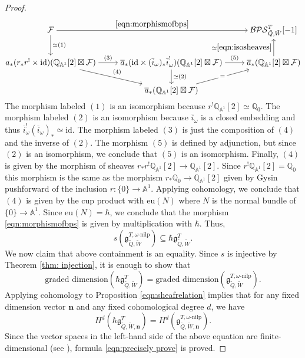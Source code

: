 \documentclass{amsart}
\def\oi{\overline{i}}
\def\bn{{\boldsymbol{n}}}
\begin{document}
\begin{proof}
\[\begin{tikzcd}[cramped]
	{\mathcal{F}} && {\mathcal{BPS}^T_{\tilde{Q},\tilde{W}}[-1]} \\
	{a_{*}(r_{*}r^! \times \mathrm{id})(\mathbb{Q}_{\mathbb{A}^1}[2] \boxtimes \mathcal{F}}) & {\overline{a}_{*}(\mathrm{id} \times (\oi_{\omega})_{*}\oi_{\omega}^!)(\mathbb{Q}_{\mathbb{A}^1}[2] \boxtimes \mathcal{F})} & {\overline{a}_{*}(\mathbb{Q}_{\mathbb{A}^1}[2] \boxtimes \mathcal{F})} \\
	& {\overline{a}_{*}(\mathbb{Q}_{\mathbb{A}^1}[2] \boxtimes \mathcal{F})}
	\arrow["{\eqref{eqn:morphismofbps}}", from=1-1, to=1-3]
	\arrow["{{\simeq (1) } }", from=1-1, to=2-1]
	\arrow["{(3)}", from=2-1, to=2-2]
	\arrow["{(4)}", from=2-1, to=3-2]
	\arrow["{(5)}", from=2-2, to=2-3]
	\arrow["{\simeq (2)}", from=2-2, to=3-2]
	\arrow["{{\simeq \eqref{eqn:isosheaves}}}", from=2-3, to=1-3]
	\arrow["{=}"{description}, from=3-2, to=2-3]
\end{tikzcd}\]
The morphism labeled $(1)$ is an isomorphism because $r^! \mathbb{Q}_{\mathbb{A}^1}[2] \simeq \mathbb{Q}_{0}$. The morphism labeled $(2)$ is an isomorphism because $\overline{i}_{\omega}$ is a closed embedding and thus $\oi^{!}_{\omega}(\oi_{\omega})_{*} \simeq \mathrm{id}.$ The morphism labeled $(3)$ is just the composition of $(4)$ and the inverse of $(2)$. The morphism $(5)$ is defined by adjunction, but since $(2)$ is an isomorphism, we conclude that $(5)$ is an isomorphism. 
Finally, $(4)$ is given by the morphism of sheaves $r_{*}r^! \mathbb{Q}_{\mathbb{A}^1}[2] \rightarrow \mathbb{Q}_{\mathbb{A}^1}[2]$. Since $r^!\mathbb{Q}_{\mathbb{A}^1}[2]=\mathbb{Q}_{0}$ this morphism is the same as the morphism $r_{*} \mathbb{Q}_{0} \rightarrow \mathbb{Q}_{\mathbb{A}^1}[2]$ given by Gysin pushforward of the inclusion $r:\{0\} \rightarrow \mathbb{A}^1$. Applying cohomology, we conclude that $(4)$ is given by the cup product with $\mathrm{eu}(N)$ where $N$ is the normal bundle of $\{0\} \rightarrow \mathbb{A}^1$. Since $\mathrm{eu}(N)=\hbar$, we conclude that the morphism \eqref{eqn:morphismofbps} is given by multiplication with $\hbar$. Thus, 
$$
s(\mathfrak{g}^{T,\omega\text{-nilp}}_{\tilde{Q},\tilde{W}}) \subseteq \hbar \mathfrak{g}^T_{\tilde{Q},\tilde{W}}.
$$ 
We now claim that above containment is an equality. Since $s$ is injective by Theorem \ref{thm: injection}, it is enough to show that 
\begin{equation}
\label{eqn:precisely prove}
\text{graded dimension} \left( \hbar \mathfrak{g}^T_{\tilde{Q},\tilde{W}} \right) = \text{graded dimension} \left(\mathfrak{g}^{T,\omega\text{-nilp}}_{\tilde{Q},\tilde{W}}\right).
\end{equation}
Applying cohomology to Proposition \ref{eqn:sheafrelation} implies that for any fixed dimension vector $\bn$ and any fixed cohomological degree $d$, we have
$$
H^d(\hbar \mathfrak{g}^T_{\tilde{Q},\tilde{W},\bn}) = H^d(\mathfrak{g}^{T,\omega\text{-nilp}}_{\tilde{Q},\tilde{W},\bn}).
$$ 
Since the vector spaces in the left-hand side of the above equation are finite-dimensional (see \cite[Theorem A]{davison2020cohomological}), formula \eqref{eqn:precisely prove} is proved. \end{proof}
\end{document}
